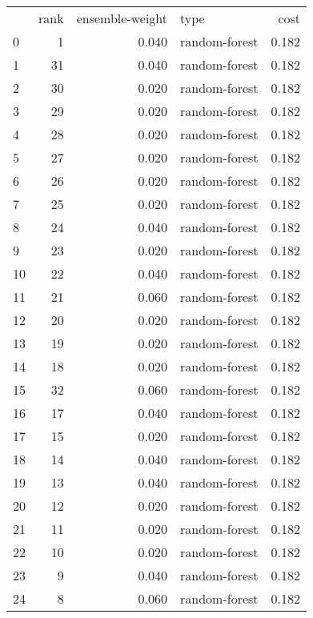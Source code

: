 \begin{table}[]
	\centering
	\begin{tabular}{lrrlr}
		   & rank & ensemble-weight & type          & cost  \\
		0  & 1    & 0.040           & random-forest & 0.182 \\
		1  & 31   & 0.040           & random-forest & 0.182 \\
		2  & 30   & 0.020           & random-forest & 0.182 \\
		3  & 29   & 0.020           & random-forest & 0.182 \\
		4  & 28   & 0.020           & random-forest & 0.182 \\
		5  & 27   & 0.020           & random-forest & 0.182 \\
		6  & 26   & 0.020           & random-forest & 0.182 \\
		7  & 25   & 0.020           & random-forest & 0.182 \\
		8  & 24   & 0.040           & random-forest & 0.182 \\
		9  & 23   & 0.020           & random-forest & 0.182 \\
		10 & 22   & 0.040           & random-forest & 0.182 \\
		11 & 21   & 0.060           & random-forest & 0.182 \\
		12 & 20   & 0.020           & random-forest & 0.182 \\
		13 & 19   & 0.020           & random-forest & 0.182 \\
		14 & 18   & 0.020           & random-forest & 0.182 \\
		15 & 32   & 0.060           & random-forest & 0.182 \\
		16 & 17   & 0.040           & random-forest & 0.182 \\
		17 & 15   & 0.020           & random-forest & 0.182 \\
		18 & 14   & 0.040           & random-forest & 0.182 \\
		19 & 13   & 0.040           & random-forest & 0.182 \\
		20 & 12   & 0.020           & random-forest & 0.182 \\
		21 & 11   & 0.020           & random-forest & 0.182 \\
		22 & 10   & 0.020           & random-forest & 0.182 \\
		23 & 9    & 0.040           & random-forest & 0.182 \\
		24 & 8    & 0.060           & random-forest & 0.182 \\

\end{tabular}
\end{table}
